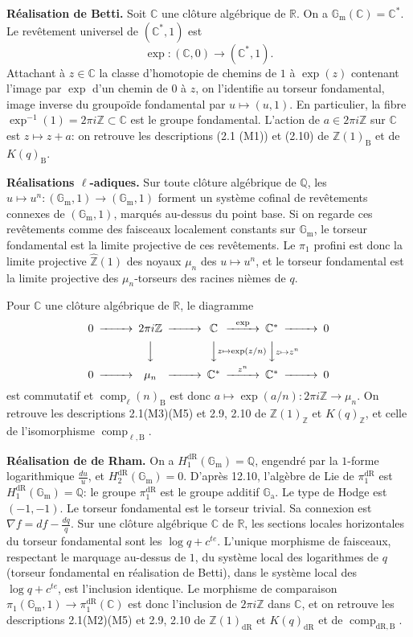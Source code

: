 \documentclass[12pt,a4paper]{article}
\theoremstyle{plain}
\theoremstyle{definition}
\theoremstyle{remark}
\DeclareMathOperator{\comp}{comp}
\newcommand*{\Gm}{\mathbb{G}_\mathrm{m}}
\newcommand{\Ga}{\mathbb{G}_\mathrm{a}}
\newcommand{\bZ}{\mathbb{Z}}
\newcommand{\bQ}{\mathbb{Q}}
\newcommand{\bR}{\mathbb{R}}
\newcommand{\bC}{\mathbb{C}}
\newcommand{\dr}{\mathrm{dR}}
\newcommand{\B}{\mathrm{B}}
\begin{document}
\textbf{Réalisation de Betti.} Soit $\bC$ une clôture algébrique de $\bR$. On a $\Gm(\bC) = \bC^*$. Le revêtement universel de $(\bC^*, 1)$ est
\[
\exp : (\bC, 0) \to (\bC^*, 1).
\]
Attachant à $z \in \bC$ la classe d'homotopie de chemins de $1$ à $\exp(z)$ contenant l'image par $\exp$ d'un chemin de $0$ à $z$, on l'identifie au torseur fondamental, image inverse du groupoïde fondamental par $u \mapsto (u, 1)$. En particulier, la fibre $\exp^{-1}(1) = 2\pi i \bZ \subset \bC$ est le groupe fondamental. L'action de $a \in 2\pi i \bZ$ sur $\bC$ est $z \mapsto z + a$: on retrouve les descriptions (2.1 (M1)) et (2.10) de $\bZ(1)_{\B}$ et de $K(q)_{\B}$.

\textbf{Réalisations $\ell$-adiques.} Sur toute clôture algébrique de $\bQ$, les $u \mapsto u^n: (\Gm, 1) \to (\Gm, 1)$ forment un système cofinal de revêtements connexes de $(\Gm, 1)$, marqués au-dessus du point base. Si on regarde ces revêtements comme des faisceaux localement constants sur $\Gm$, le torseur fondamental est la limite projective de ces revêtements. Le $\pi_1$ profini est donc la limite projective $\hat{\bZ}(1)$ des noyaux $\mu_n$ des $u \mapsto u^n$, et le torseur fondamental est la limite projective des $\mu_n$-torseurs des racines nièmes de $q$.

Pour $\bC$ une clôture algébrique de $\bR$, le diagramme
\[
\begin{CD}
0 @>>> 2\pi i \bZ @>>> \bC @>{\exp}>> \bC^* @>>> 0 \\
@. @VVV @VV{z \mapsto \exp(z/n)}V @VV{z \mapsto z^n}V \\
0 @>>> \mu_n @>>> \bC^* @>{z^n}>> \bC^* @>>> 0
\end{CD}
\]
est commutatif et $\comp_{\ell}(n)_{\B}$ est donc $a \mapsto \exp(a/n): 2\pi i \bZ \to \mu_n$. On retrouve les descriptions 2.1(M3)(M5) et 2.9, 2.10 de $\bZ(1)_{\bZ}$ et $K(q)_{\bZ}$, et celle de l'isomorphisme $\comp_{\ell, \B}$.

\textbf{Réalisation de de Rham.} On a $H_1^{\dr}(\Gm) = \bQ$, engendré par la $1$-forme logarithmique $\frac{du}{u}$, et $H_2^{\dr}(\Gm) = 0$. D'après 12.10, l'algèbre de Lie de $\pi_1^{\dr}$ est $H_{1}^{\dr}(\Gm) = \bQ$: le groupe $\pi_1^{\dr}$ est le groupe additif $\Ga$. Le type de Hodge est $(-1,-1)$. Le torseur fondamental est le torseur trivial. Sa connexion est $\nabla f = df - \frac{dq}{q}$. Sur une clôture algébrique $\bC$ de $\bR$, les sections locales horizontales du torseur fondamental sont les $\log q + c^{te}$. L'unique morphisme de faisceaux, respectant le marquage au-dessus de $1$, du système local des logarithmes de $q$ (torseur fondamental en réalisation de Betti), dans le système local des $\log q + c^{te}$, est l'inclusion identique. Le morphisme de comparaison $\pi_1(\Gm, 1) \to \pi_1^{\dr}(\bC)$ est donc l'inclusion de $2\pi i \bZ$ dans $\bC$, et on retrouve les descriptions 2.1(M2)(M5) et 2.9, 2.10 de $\bZ(1)_{\dr}$ et $K(q)_{\dr}$ et de $\comp_{\dr,\B}$.
\end{document}
